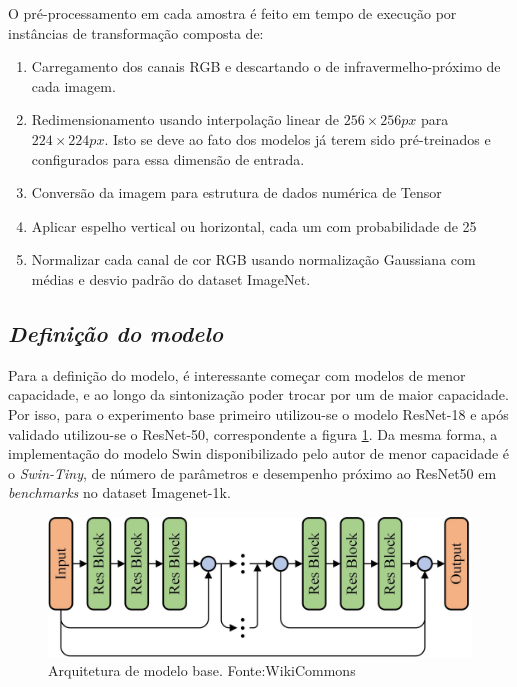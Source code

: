 O pré-processamento em cada amostra é feito em tempo de execução por instâncias de transformação composta de:
\begin{enumerate}
    \item   Carregamento dos canais RGB e descartando o de infravermelho-próximo de cada imagem.
    \item   Redimensionamento usando interpolação linear de $256 \times 256px$ para $224 \times 224px$. Isto se deve ao fato dos modelos já terem sido pré-treinados e configurados para essa dimensão de entrada.
    \item   Conversão da imagem para estrutura de dados numérica de Tensor
    \item   Aplicar espelho vertical ou horizontal, cada um com probabilidade de 25%
    \item   Normalizar cada canal de cor RGB usando normalização Gaussiana com médias e desvio padrão do dataset ImageNet.
\end{enumerate}


\subsection{\textit{Definição do modelo}}\label{sec:Cap3_Def_modelo}


Para a definição do modelo, é interessante começar com modelos de menor capacidade, e ao longo da sintonização poder trocar por um de maior capacidade. Por isso, para o experimento base primeiro utilizou-se o modelo ResNet-18 e após validado utilizou-se o ResNet-50, correspondente a figura \ref{fig:ResNet-Rsp}. Da mesma forma, a implementação do modelo Swin disponibilizado pelo autor de menor capacidade é o \textit{Swin-Tiny}, de número de parâmetros e desempenho próximo ao ResNet50 em \textit{benchmarks} no dataset Imagenet-1k.

\begin{figure}[!ht]
    \centering
    \includegraphics[width=0.9\columnwidth]{Imagens/An-illustration-of-the-deep-residual-network-ResNet-structure-More-shortcut.jpg}
    \caption{ Arquitetura de modelo base. Fonte:WikiCommons}
   \label{fig:ResNet-Rsp}
\end{figure}


